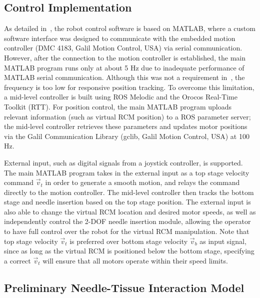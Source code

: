 \subsection{Control Implementation}
\label{sec:chap-2-control-implementation}

As detailed in~\parencite{liFullyActuatedBodyMounted2020a}, the robot control software is based on MATLAB, where a custom software interface was designed to communicate with the embedded motion controller (DMC 4183, Galil Motion Control, USA) via serial communication. However, after the connection to the motion controller is established, the main MATLAB program runs only at about 5 Hz due to inadequate performance of MATLAB serial communication. Although this was not a requirement in~\cite{liFullyActuatedBodyMounted2020a}, the frequency is too low for responsive position tracking. To overcome this limitation, a mid-level controller is built using ROS Melodic and the Orocos Real-Time Toolkit (RTT). For position control, the main MATLAB program uploads relevant information (such as virtual RCM position) to a ROS parameter server; the mid-level controller retrieves these parameters and updates motor positions via the Galil Communication Library (gclib, Galil Motion Control, USA) at 100 Hz.

External input, such as digital signals from a joystick controller, is supported. The main MATLAB program takes in the external input as a top stage velocity command $\vec{v}_t$ in order to generate a smooth motion, and relays the command directly to the motion controller. The mid-level controller then tracks the bottom stage and needle insertion based on the top stage position. The external input is also able to change the virtual RCM location and desired motor speeds, as well as independently control the 2-DOF needle insertion module, allowing the operator to have full control over the robot for the virtual RCM manipulation. Note that top stage velocity $\vec{v}_t$ is preferred over bottom stage velocity $\vec{v}_b$ as input signal, since as long as the virtual RCM is positioned below the bottom stage, specifying a correct $\vec{v}_t$ will ensure that all motors operate within their speed limits.

\subsection{Preliminary Needle-Tissue Interaction Model}
\label{sec:chap-2-preliminary-interaction-model}

